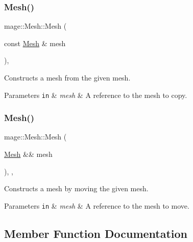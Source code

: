 \subsubsection{\texorpdfstring{Mesh()}{Mesh()}\hspace{0.1cm}{\footnotesize\ttfamily [2/3]}}
{\footnotesize\ttfamily mage\+::\+Mesh\+::\+Mesh (\begin{DoxyParamCaption}\item[{const \hyperlink{classmage_1_1_mesh}{Mesh} \&}]{mesh }\end{DoxyParamCaption})\hspace{0.3cm}{\ttfamily [protected]}, {\ttfamily [delete]}}

Constructs a mesh from the given mesh.


\begin{DoxyParams}[1]{Parameters}
\mbox{\tt in}  & {\em mesh} & A reference to the mesh to copy. \\
\hline
\end{DoxyParams}
\hypertarget{classmage_1_1_mesh_aaa8f270d59a8fc629cd695c75c9ff7c7}{}\label{classmage_1_1_mesh_aaa8f270d59a8fc629cd695c75c9ff7c7} 
\subsubsection{\texorpdfstring{Mesh()}{Mesh()}\hspace{0.1cm}{\footnotesize\ttfamily [3/3]}}
{\footnotesize\ttfamily mage\+::\+Mesh\+::\+Mesh (\begin{DoxyParamCaption}\item[{\hyperlink{classmage_1_1_mesh}{Mesh} \&\&}]{mesh }\end{DoxyParamCaption})\hspace{0.3cm}{\ttfamily [protected]}, {\ttfamily [default]}, {\ttfamily [noexcept]}}

Constructs a mesh by moving the given mesh.


\begin{DoxyParams}[1]{Parameters}
\mbox{\tt in}  & {\em mesh} & A reference to the mesh to move. \\
\hline
\end{DoxyParams}


\subsection{Member Function Documentation}
\hypertarget{classmage_1_1_mesh_af9ad71652a15e387774904dc8cabf28b}{}\label{classmage_1_1_mesh_af9ad71652a15e387774904dc8cabf28b} 
